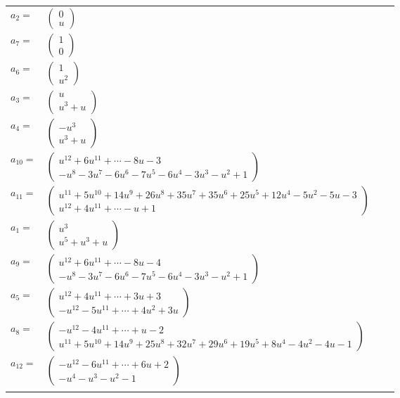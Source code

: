 \documentclass[1p]{elsarticle_modified}
\theoremstyle{definition}
\begin{document}
\begin{tabular}{m{7pt} m{180pt} m{7pt} m{180pt} }
\flushright $a_{2}=$&$\begin{pmatrix}0\\u\end{pmatrix}$ \\
\flushright $a_{7}=$&$\begin{pmatrix}1\\0\end{pmatrix}$ \\
\flushright $a_{6}=$&$\begin{pmatrix}1\\u^2\end{pmatrix}$ \\
\flushright $a_{3}=$&$\begin{pmatrix}u\\u^3+u\end{pmatrix}$ \\
\flushright $a_{4}=$&$\begin{pmatrix}- u^3\\u^3+u\end{pmatrix}$ \\
\flushright $a_{10}=$&$\begin{pmatrix}u^{12}+6 u^{11}+\cdots-8 u-3\\- u^8-3 u^7-6 u^6-7 u^5-6 u^4-3 u^3- u^2+1\end{pmatrix}$ \\
\flushright $a_{11}=$&$\begin{pmatrix}u^{11}+5 u^{10}+14 u^9+26 u^8+35 u^7+35 u^6+25 u^5+12 u^4-5 u^2-5 u-3\\u^{12}+4 u^{11}+\cdots- u+1\end{pmatrix}$ \\
\flushright $a_{1}=$&$\begin{pmatrix}u^3\\u^5+u^3+u\end{pmatrix}$ \\
\flushright $a_{9}=$&$\begin{pmatrix}u^{12}+6 u^{11}+\cdots-8 u-4\\- u^8-3 u^7-6 u^6-7 u^5-6 u^4-3 u^3- u^2+1\end{pmatrix}$ \\
\flushright $a_{5}=$&$\begin{pmatrix}u^{12}+4 u^{11}+\cdots+3 u+3\\- u^{12}-5 u^{11}+\cdots+4 u^2+3 u\end{pmatrix}$ \\
\flushright $a_{8}=$&$\begin{pmatrix}- u^{12}-4 u^{11}+\cdots+u-2\\u^{11}+5 u^{10}+14 u^9+25 u^8+32 u^7+29 u^6+19 u^5+8 u^4-4 u^2-4 u-1\end{pmatrix}$ \\
\flushright $a_{12}=$&$\begin{pmatrix}- u^{12}-6 u^{11}+\cdots+6 u+2\\- u^4- u^3- u^2-1\end{pmatrix}$\\&\end{tabular}
\end{document}
